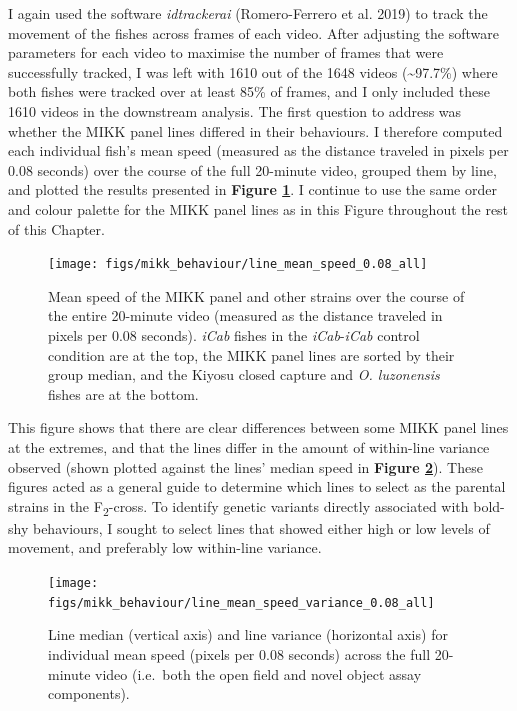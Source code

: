 \documentclass[
]{book}
\begin{document}
I again used the software \emph{idtrackerai} (Romero-Ferrero et al. 2019) to track the movement of the fishes across frames of each video. After adjusting the software parameters for each video to maximise the number of frames that were successfully tracked, I was left with 1610 out of the 1648 videos (\textasciitilde97.7\%) where both fishes were tracked over at least 85\% of frames, and I only included these 1610 videos in the downstream analysis. The first question to address was whether the MIKK panel lines differed in their behaviours. I therefore computed each individual fish's mean speed (measured as the distance traveled in pixels per 0.08 seconds) over the course of the full 20-minute video, grouped them by line, and plotted the results presented in \textbf{Figure \ref{fig:mikk-mean-speed}}. I continue to use the same order and colour palette for the MIKK panel lines as in this Figure throughout the rest of this Chapter.



\begin{figure}
\texttt{[image: figs/mikk\_behaviour/line\_mean\_speed\_0.08\_all]} \caption{Mean speed of the MIKK panel and other strains over the course of the entire 20-minute video (measured as the distance traveled in pixels per 0.08 seconds). \emph{\textcolor{iCab_424B4D}{iCab}} fishes in the \emph{\textcolor{iCab_424B4D}{iCab}}-\emph{\textcolor{iCab_424B4D}{iCab}} control condition are at the top, the MIKK panel lines are sorted by their group median, and the Kiyosu closed capture and \emph{O. luzonensis} fishes are at the bottom.}\label{fig:mikk-mean-speed}
\end{figure}

This figure shows that there are clear differences between some MIKK panel lines at the extremes, and that the lines differ in the amount of within-line variance observed (shown plotted against the lines' median speed in \textbf{Figure \ref{fig:mikk-mean-speed-variance}}). These figures acted as a general guide to determine which lines to select as the parental strains in the F\textsubscript{2}-cross. To identify genetic variants directly associated with bold-shy behaviours, I sought to select lines that showed either high or low levels of movement, and preferably low within-line variance.



\begin{figure}
\texttt{[image: figs/mikk\_behaviour/line\_mean\_speed\_variance\_0.08\_all]} \caption{Line median (vertical axis) and line variance (horizontal axis) for individual mean speed (pixels per 0.08 seconds) across the full 20-minute video (i.e.~both the open field and novel object assay components).}\label{fig:mikk-mean-speed-variance}
\end{figure}
\end{document}
